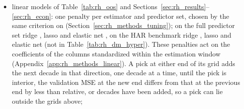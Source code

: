 \begin{itemize}
\begin{itemize}
  \item linear models of Table~\ref{tab:rh_oos} and Sections~\ref{sec:rh_results}--\ref{sec:rh_econ}: one
    penalty per estimator and predictor set, chosen by the same criterion on \rhorPenSample{}
    (Section~\ref{sec:rh_methods_tuning}); on the full predictor set ridge \rhdmPlPenRidgeAll, lasso
    \rhdmPlPenLassoAll{} and elastic net \rhdmPlPenEnetAll, on the HAR benchmark ridge \rhdmPlPenRidgeBase, lasso
    \rhdmPlPenLassoBase{} and elastic net \rhdmPlPenEnetBase{} (not in Table~\ref{tab:rh_dm_hyper}). These
    penalties act on the coefficients of the columns standardized within the estimation window
    (Appendix~\ref{app:rh_methods_linear}). A pick at either end of its grid adds the next decade in that direction,
    one decade at a time, until the pick is interior, the validation MSE at the new end differs from that at the
    previous end by less than \rhdmPlGridExtTol{} relative, or \rhdmPlGridExtCap{} decades have been added, so a
    pick can lie outside the grids above;

\end{itemize}
\end{itemize}
